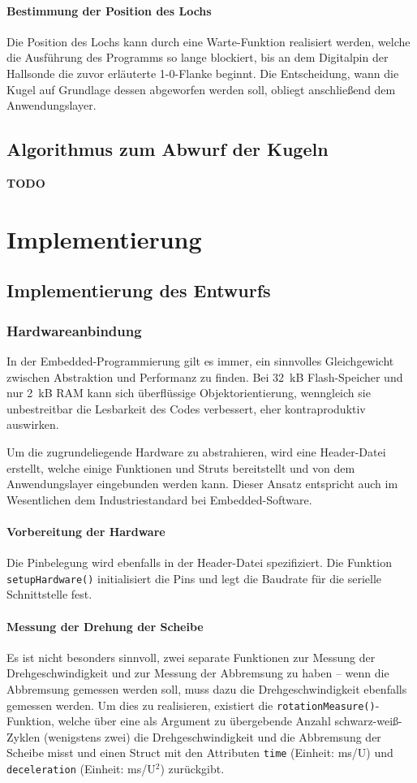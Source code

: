 \documentclass{kis}
\newcommand{\todo}{\textbf{TODO}}
\begin{document}
\paragraph{Bestimmung der Position des Lochs}
Die Position des Lochs kann durch eine Warte-Funktion realisiert werden, welche die Ausführung des Programms so lange blockiert, bis an dem Digitalpin der Hallsonde die zuvor erläuterte 1-0-Flanke beginnt. Die Entscheidung, wann die Kugel auf Grundlage dessen abgeworfen werden soll, obliegt anschließend dem Anwendungslayer. 

\subsection{Algorithmus zum Abwurf der Kugeln}
\todo

\section{Implementierung}

\subsection{Implementierung des Entwurfs}
\subsubsection{Hardwareanbindung}
In der Embedded-Programmierung gilt es immer, ein sinnvolles Gleichgewicht zwischen Abstraktion und Performanz zu finden. Bei 32~kB Flash-Speicher und nur 2~kB RAM kann sich überflüssige Objektorientierung, wenngleich sie unbestreitbar die Lesbarkeit des Codes verbessert, eher kontraproduktiv auswirken.

Um die zugrundeliegende Hardware zu abstrahieren, wird eine Header-Datei erstellt, welche einige Funktionen und Struts bereitstellt und von dem Anwendungslayer eingebunden werden kann. Dieser Ansatz entspricht auch im Wesentlichen dem Industriestandard bei Embedded-Software.

\paragraph{Vorbereitung der Hardware}
Die Pinbelegung wird ebenfalls in der Header-Datei spezifiziert. Die Funktion \texttt{setupHardware()} initialisiert die Pins und legt die Baudrate für die serielle Schnittstelle fest.

\paragraph{Messung der Drehung der Scheibe}
Es ist nicht besonders sinnvoll, zwei separate Funktionen zur Messung der Drehgeschwindigkeit und zur Messung der Abbremsung zu haben -- wenn die Abbremsung gemessen werden soll, muss dazu die Drehgeschwindigkeit ebenfalls gemessen werden. Um dies zu realisieren, existiert die \texttt{rotationMeasure()}-Funktion, welche über eine als Argument zu übergebende Anzahl schwarz-weiß-Zyklen (wenigstens zwei) die Drehgeschwindigkeit und die Abbremsung der Scheibe misst und einen Struct mit den Attributen \texttt{time} (Einheit: ms/U) und \texttt{deceleration} (Einheit: ms/U$^2$) zurückgibt.
\end{document}
